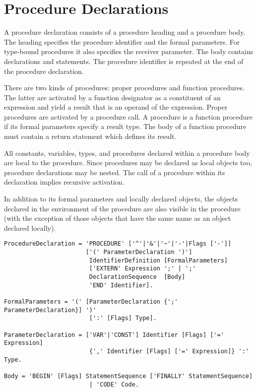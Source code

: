 \documentclass[a4wide,11pt]{article}
\begin{document}
\section{Procedure Declarations}

A procedure declaration consists of a procedure heading and a procedure body.
The heading specifies the procedure identifier and the formal parameters.
For type-bound procedures it also specifies the receiver parameter.
The body contains declarations and statements.
The procedure identifier is repeated at the end of the procedure declaration.

There are two kinds of procedures: proper procedures and function procedures.
The latter are activated by a function designator as a constituent of an expression and yield a result that is an operand of the expression.
Proper procedures are activated by a procedure call.
A procedure is a function procedure if its formal parameters specify a result type.
The body of a function procedure must contain a return statement which defines its result.

All constants, variables, types, and procedures declared within a procedure body are local to the procedure.
Since procedures may be declared as local objects too, procedure declarations may be nested.
The call of a procedure within its declaration implies recursive activation.

In addition to its formal parameters and locally declared objects, the objects declared in the environment of the procedure are also visible in the procedure (with the exception of those objects that have the same name as an object declared locally).

\begin{lstlisting}[style=ebnf]
ProcedureDeclaration = 'PROCEDURE' ['^'|'&'|'~'|'-'|Flags ['-']]
                       ['(' ParameterDeclaration ')']
                        IdentifierDefinition [FormalParameters]
                        ['EXTERN' Expression ';' | ';'
                        DeclarationSequence  [Body]
                        'END' Identifier].

FormalParameters = '(' [ParameterDeclaration {';' ParameterDeclaration}] ')'
                        [':' [Flags] Type].

ParameterDeclaration = ['VAR'|'CONST'] Identifier [Flags] ['=' Expression]
						{',' Identifier [Flags] ['=' Expression]} ':' Type.

Body = 'BEGIN' [Flags] StatementSequence ['FINALLY' StatementSequence]
						| 'CODE' Code.
\end{lstlisting}
\end{document}
